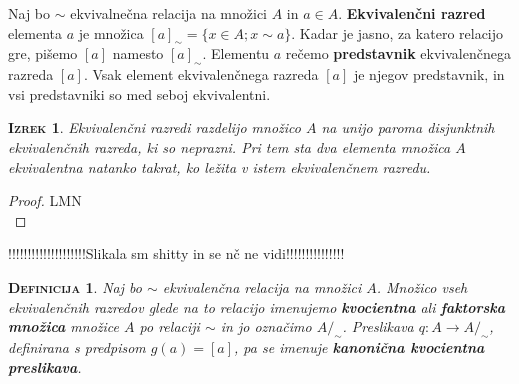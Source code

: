 \documentclass[a4paper,12pt]{article}
\newtheorem*{izrek}{\textsc{Izrek}}
\newtheorem*{definicija}{\textsc{Definicija}}
\begin{document}
Naj bo $\sim$ ekvivalnečna relacija na množici $A$ in $a\in A$. \textbf{Ekvivalenčni razred} elementa $a$ je množica $[a]_\sim=\{x\in A;x\sim a\}$. Kadar je jasno, za katero relacijo gre, pišemo $[a]$ namesto $[a]_\sim$. Elementu $a$ rečemo \textbf{predstavnik} ekvivalenčnega razreda $[a]$. Vsak element ekvivalenčnega razreda $[a]$ je njegov predstavnik, in vsi predstavniki so med seboj ekvivalentni. \\

\begin{izrek}
Ekvivalenčni razredi razdelijo množico $A$ na unijo paroma disjunktnih ekvivalenčnih razreda, ki so neprazni. Pri tem sta dva elementa množica $A$ ekvivalentna natanko takrat, ko ležita v istem ekvivalenčnem razredu. \\
\end{izrek}

\begin{proof}
LMN \\
\end{proof}

!!!!!!!!!!!!!!!!!!!!Slikala sm shitty in se nč ne vidi!!!!!!!!!!!!!!! \\

\begin{definicija}
Naj bo $\sim$ ekvivalenčna relacija na množici $A$. Množico vseh ekvivalenčnih razredov glede na to relacijo imenujemo \textbf{kvocientna} ali \textbf{faktorska množica} množice $A$ po relaciji $\sim$ in jo označimo $A/_\sim$. Preslikava $q:A\to A/_\sim$, definirana s predpisom $g(a)=[a]$, pa se imenuje \textbf{kanonična kvocientna preslikava}. \\
\end{definicija}

\newpage 
\end{document}

